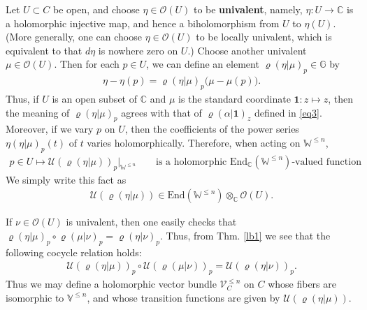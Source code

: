 \documentclass[11pt,b5paper,notitlepage]{article}
\theoremstyle{definition}
\theoremstyle{plain}
\newcommand{\mc}{\mathcal}
\newcommand{\End}{\mathrm{End}} %
\newcommand{\id}{\mathbf{1}}
\newcommand{\scr}{\mathscr}
\newcommand{\Vbb}{\mathbb V}
\newcommand{\Wbb}{\mathbb W}
\newcommand{\Gbb}{\mathbb G}
\newcommand{\Cbb}{\mathbb C}
\numberwithin{equation}{section}
\begin{document}
Let $U\subset C$ be open, and choose $\eta\in\scr O(U)$ to be \textbf{univalent}, namely, $\eta:U\rightarrow \Cbb$ is a holomorphic injective map, and hence a biholomorphism from $U$ to $\eta(U)$. (More generally, one can choose $\eta\in\scr O(U)$ to be locally univalent, which is equivalent to that $d\eta$ is nowhere zero on $U$.) Choose another univalent $\mu\in\scr O(U)$. Then for each $p\in U$, we can define an element $\varrho(\eta|\mu)_p\in\Gbb$  by
\begin{align}
\eta-\eta(p)=\varrho(\eta|\mu)_p\big(\mu-\mu(p)\big).
\end{align}
Thus, if $U$ is an open subset of $\Cbb$ and $\mu$ is the standard coordinate $\id:z\mapsto z$, then the meaning of $\varrho(\eta|\mu)_p$ agrees with that of $\varrho(\alpha|\id)_z$ defined in \eqref{eq3}. Moreover, if we vary $p$ on $U$, then the coefficients of the power series $\eta(\eta|\mu)_p(t)$ of $t$ varies holomorphically. Therefore, when acting on $\Wbb^{\leq n}$,
\begin{align*}
p\in U\mapsto\mc U(\varrho(\eta|\mu))_p\big|_{\Wbb^{\leq n}}\qquad\text{is a holomorphic $\End_\Cbb(\Wbb^{\leq n})$-valued function} 
\end{align*}
We simply write this fact as
\begin{align*}
\mc U(\varrho(\eta|\mu))\in\End(\Wbb^{\leq n})\otimes_\Cbb\scr O(U).
\end{align*}


If $\nu\in\scr O(U)$ is univalent, then one easily checks that $\varrho(\eta|\mu)_p\circ\varrho(\mu|\nu)_p=\varrho(\eta|\nu)_p$. Thus, from Thm. \ref{lb1} we see that the following cocycle relation holds:
\begin{align*}
\mc U(\varrho(\eta|\mu))_p\circ \mc U(\varrho(\mu|\nu))_p=\mc U(\varrho(\eta|\nu))_p.
\end{align*}
Thus we may define a holomorphic vector bundle $\scr V^{\leq n}_C$ on $C$ whose fibers are isomorphic to $\Vbb^{\leq n}$, and whose transition functions are given by $\mc U(\varrho(\eta|\mu))$. 
\end{document}
